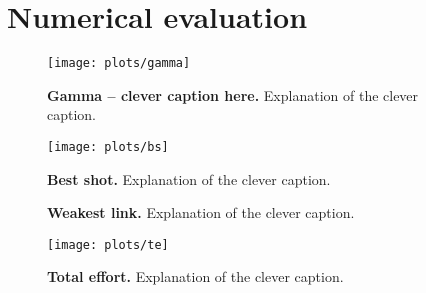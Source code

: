 %
%
\section{Numerical evaluation}
\label{sec:numerical}

\begin{figure}
\begin{center}
\texttt{[image: plots/gamma]}
\caption{\label{fig:gamma} {\bf Gamma -- clever caption here.} Explanation of the clever caption.}
\end{center}
\end{figure}
\begin{figure}
\begin{center}
\texttt{[image: plots/bs]}
\caption{\label{fig:bs} {\bf Best shot.} Explanation of the clever caption.}
\end{center}
\end{figure}
\begin{figure}
\begin{center}
\quad
{}
\caption{\label{fig:wl} {\bf Weakest link.} Explanation of the clever caption.}
\end{center}
\end{figure}
\begin{figure}
\begin{center}
\texttt{[image: plots/te]}
\caption{\label{fig:te} {\bf Total effort.} Explanation of the clever caption.}
\end{center}
\end{figure}
